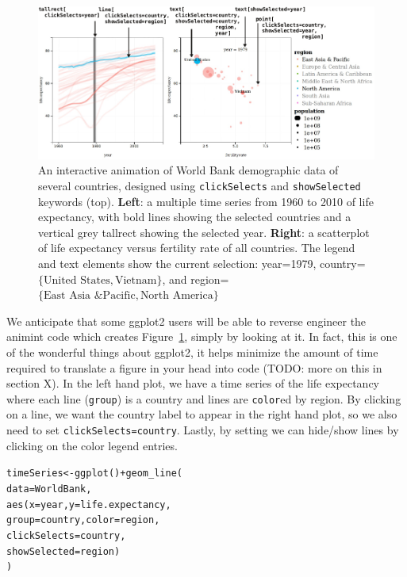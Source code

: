 \documentclass[journal]{vgtc}\usepackage[]{graphicx}\usepackage[]{color}
\makeatletter
\newcommand{\hlopt}[1]{\textcolor[rgb]{0,0,0}{#1}}%
\newcommand{\hlstd}[1]{\textcolor[rgb]{0,0,0}{#1}}%
\newcommand{\hlkwb}[1]{\textcolor[rgb]{0,0,0}{#1}}%
\newcommand{\hlkwc}[1]{\textcolor[rgb]{0,0,1}{#1}}%
\newcommand{\hlkwd}[1]{\textcolor[rgb]{0,0,0}{#1}}%
\newenvironment{kframe}{%
 \def\at@end@of@kframe{}%
 \ifinner\ifhmode%
  \def\at@end@of@kframe{\end{minipage}}%
  \begin{minipage}{\columnwidth}%
 \fi\fi%
 \def\FrameCommand##1{\hskip\@totalleftmargin \hskip-\fboxsep
 \colorbox{shadecolor}{##1}\hskip-\fboxsep
     \hskip-\linewidth \hskip-\@totalleftmargin \hskip\columnwidth}%
 \MakeFramed {\advance\hsize-\width
   \@totalleftmargin\z@ \linewidth\hsize
   \@setminipage}}%
 {\par\unskip\endMakeFramed%
 \at@end@of@kframe}
\newenvironment{knitrout}{}{} %
\makeatother
\begin{document}
\begin{figure}[htp]
  \centering
  \includegraphics[width=\textwidth]{figure-1}
  \caption{An interactive animation of World Bank demographic data of
    several countries, designed using \texttt{clickSelects} and
    \texttt{showSelected} keywords (top).  \textbf{Left}: a multiple
    time series from 1960 to 2010 of life expectancy, with bold lines
    showing the selected countries and a vertical grey tallrect
    showing the selected year. \textbf{Right}: a scatterplot of life
    expectancy versus fertility rate of all countries. The legend and
    text elements show the current selection: year=1979,
    country=$\{\textrm{United States}, \textrm{Vietnam}\}$, and
    region=$\{\textrm{East Asia \& Pacific}, \textrm{North
      America}\}$}
  \label{fig:worldbank}
\end{figure}

We anticipate that some ggplot2 users will be able to reverse engineer the
animint code which creates Figure~\ref{fig:worldbank}, simply by looking at it.
In fact, this is one of the wonderful things about ggplot2, it helps minimize 
the amount of time required to translate a figure in your head into code 
(TODO: more on this in section X). In the left hand plot, 
we have a time series of the life expectancy where
each line (\texttt{group}) is a country and lines are \texttt{color}ed by 
region. By clicking on a line, we want the country label to appear
in the right hand plot, so we also need to set \texttt{clickSelects=country}. 
Lastly, by setting  we can hide/show lines
by clicking on the color legend entries.

\begin{knitrout}
\color{fgcolor}\begin{kframe}
\begin{alltt}
\hlstd{timeSeries} \hlkwb{<-} \hlkwd{ggplot}\hlstd{()} \hlopt{+} \hlkwd{geom_line}\hlstd{(}
  \hlkwc{data} \hlstd{= WorldBank,}
  \hlkwd{aes}\hlstd{(}\hlkwc{x} \hlstd{= year,} \hlkwc{y} \hlstd{= life.expectancy,}
      \hlkwc{group} \hlstd{= country,} \hlkwc{color} \hlstd{= region,}
      \hlkwc{clickSelects} \hlstd{= country,}
      \hlkwc{showSelected} \hlstd{= region)}
\hlstd{)}
\end{alltt}
\end{kframe}
\end{knitrout}
\end{document}
